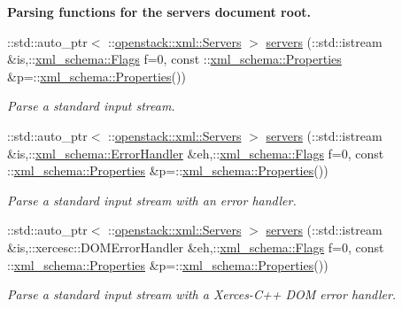 \begin{Indent}{\bf Parsing functions for the servers document root.}
\begin{DoxyCompactItemize}
::std::auto\_\-ptr$<$ ::\hyperlink{classopenstack_1_1xml_1_1Servers}{openstack::xml::Servers} $>$ \hyperlink{namespaceopenstack_1_1xml_a6d1e34c966f6d42594d5732656431f3d}{servers} (::std::istream \&is,::\hyperlink{namespacexml__schema_affb4c227cbd9aa7453dd1dc5a1401943}{xml\_\-schema::Flags} f=0, const ::\hyperlink{namespacexml__schema_ad27ce19a7ee1d3b1064092648898f64c}{xml\_\-schema::Properties} \&p=::\hyperlink{namespacexml__schema_ad27ce19a7ee1d3b1064092648898f64c}{xml\_\-schema::Properties}())
\begin{DoxyCompactList}\small\item\em Parse a standard input stream. \item\end{DoxyCompactList}\item 
::std::auto\_\-ptr$<$ ::\hyperlink{classopenstack_1_1xml_1_1Servers}{openstack::xml::Servers} $>$ \hyperlink{namespaceopenstack_1_1xml_a5594b1653f605b91917b6d5200348996}{servers} (::std::istream \&is,::\hyperlink{namespacexml__schema_ab1c9361bfd3b404eaabf0c31eded79dc}{xml\_\-schema::ErrorHandler} \&eh,::\hyperlink{namespacexml__schema_affb4c227cbd9aa7453dd1dc5a1401943}{xml\_\-schema::Flags} f=0, const ::\hyperlink{namespacexml__schema_ad27ce19a7ee1d3b1064092648898f64c}{xml\_\-schema::Properties} \&p=::\hyperlink{namespacexml__schema_ad27ce19a7ee1d3b1064092648898f64c}{xml\_\-schema::Properties}())
\begin{DoxyCompactList}\small\item\em Parse a standard input stream with an error handler. \item\end{DoxyCompactList}\item 
::std::auto\_\-ptr$<$ ::\hyperlink{classopenstack_1_1xml_1_1Servers}{openstack::xml::Servers} $>$ \hyperlink{namespaceopenstack_1_1xml_aa88c43d2f8e673c85d087f9b23b6c153}{servers} (::std::istream \&is,::xercesc::DOMErrorHandler \&eh,::\hyperlink{namespacexml__schema_affb4c227cbd9aa7453dd1dc5a1401943}{xml\_\-schema::Flags} f=0, const ::\hyperlink{namespacexml__schema_ad27ce19a7ee1d3b1064092648898f64c}{xml\_\-schema::Properties} \&p=::\hyperlink{namespacexml__schema_ad27ce19a7ee1d3b1064092648898f64c}{xml\_\-schema::Properties}())
\begin{DoxyCompactList}\small\item\em Parse a standard input stream with a Xerces-\/C++ DOM error handler. \item\end{DoxyCompactList}\item 

\end{DoxyCompactItemize}
\end{Indent}
